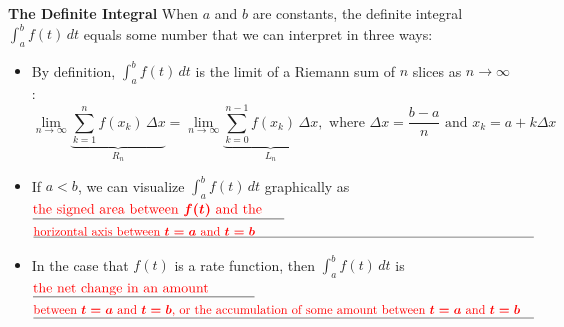 \documentclass{article}
\begin{document}
\begin{framed}
\textbf{The Definite Integral} When $a$ and $b$ are constants, the definite integral $\displaystyle \int_a^b f(t)\,dt$ equals some number that we can interpret in three ways:
    \begin{itemize}
        \item By definition, $\displaystyle \int_a^b f(t)\,dt$ is the limit of a Riemann sum of $n$ slices as $n \to \infty$: 
        \[ \lim_{n \to \infty} \underbrace{\sum_{k=1}^n f(x_k)\, \Delta x}_{R_n}
    = \lim_{n \to \infty} \underbrace{\sum_{k=0}^{n-1} f(x_k)\, \Delta
      x}_{L_n}, \text{ where } \Delta x = \frac{b - a}{n} \text{ and } x_k
    = a + k \Delta x\]
    \vspace{-17pt}
        \item If $a<b$, we can visualize $\displaystyle \int_a^b f(t)\,dt$ graphically as $\fitb{2.5in}{\text{\textcolor{red}{the signed area between $f(t)$ and the}}}$
        \newline
        \newline
        $\fitb{5.6in}{\text{\textcolor{red}{horizontal axis between $t=a$ and $t=b$}}}$
        \newline
        \item In the case that $f(t)$ is a rate function, then $\displaystyle \int_a^b f(t)\,dt$ is $\fitb{2.2in}{\text{\textcolor{red}{the net change in an amount}}}$
        \newline
        \newline
        $\fitb{5.6in}{\text{\textcolor{red}{between $t=a$ and $t=b$, or the accumulation of some amount between $t=a$ and $t=b$}}}$
    \end{itemize}
    \end{framed}
\end{document}

